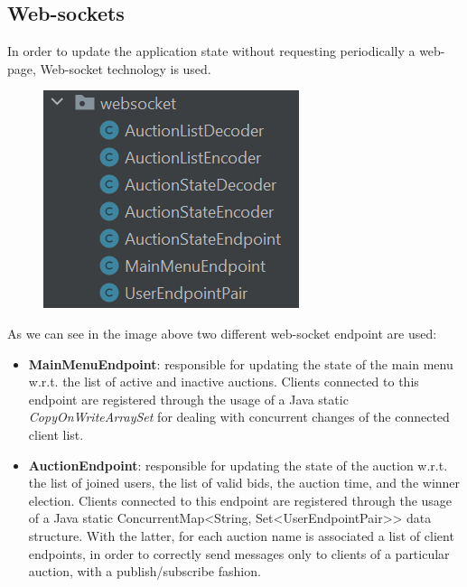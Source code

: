 \subsection{Web-sockets}
In order to update the application state without requesting periodically a web-page, Web-socket technology is used.

\begin{figure}[H]
	\centering
	\includegraphics[width=0.4\linewidth]{img/websockets}
	\caption{}
	\label{fig:websockets}
\end{figure}

As we can see in the image above two different web-socket endpoint are used:
\begin{itemize}
	\item \textbf{MainMenuEndpoint}: responsible for updating the state of the main menu w.r.t. the list of active and inactive auctions. Clients connected to this endpoint are registered through the usage of a Java static \textit{CopyOnWriteArraySet} for dealing with concurrent changes of the connected client list.
	\item \textbf{AuctionEndpoint}: responsible for updating the state of the auction w.r.t. the list of joined users, the list of valid bids, the auction time, and the winner election. Clients connected to this endpoint are registered through the usage of a Java static ConcurrentMap<String, Set<UserEndpointPair>> data structure. With the latter, for each auction name is associated a list of client endpoints, in order to correctly send messages only to clients of a particular auction, with a publish/subscribe fashion.
\end{itemize}
